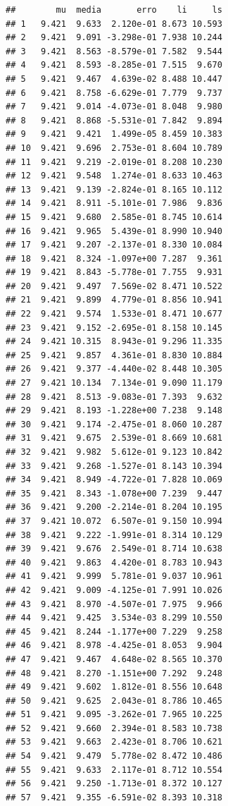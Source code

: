\documentclass[
]{book}
\begin{document}
\begin{verbatim}
##        mu  media       erro    li     ls
## 1   9.421  9.633  2.120e-01 8.673 10.593
## 2   9.421  9.091 -3.298e-01 7.938 10.244
## 3   9.421  8.563 -8.579e-01 7.582  9.544
## 4   9.421  8.593 -8.285e-01 7.515  9.670
## 5   9.421  9.467  4.639e-02 8.488 10.447
## 6   9.421  8.758 -6.629e-01 7.779  9.737
## 7   9.421  9.014 -4.073e-01 8.048  9.980
## 8   9.421  8.868 -5.531e-01 7.842  9.894
## 9   9.421  9.421  1.499e-05 8.459 10.383
## 10  9.421  9.696  2.753e-01 8.604 10.789
## 11  9.421  9.219 -2.019e-01 8.208 10.230
## 12  9.421  9.548  1.274e-01 8.633 10.463
## 13  9.421  9.139 -2.824e-01 8.165 10.112
## 14  9.421  8.911 -5.101e-01 7.986  9.836
## 15  9.421  9.680  2.585e-01 8.745 10.614
## 16  9.421  9.965  5.439e-01 8.990 10.940
## 17  9.421  9.207 -2.137e-01 8.330 10.084
## 18  9.421  8.324 -1.097e+00 7.287  9.361
## 19  9.421  8.843 -5.778e-01 7.755  9.931
## 20  9.421  9.497  7.569e-02 8.471 10.522
## 21  9.421  9.899  4.779e-01 8.856 10.941
## 22  9.421  9.574  1.533e-01 8.471 10.677
## 23  9.421  9.152 -2.695e-01 8.158 10.145
## 24  9.421 10.315  8.943e-01 9.296 11.335
## 25  9.421  9.857  4.361e-01 8.830 10.884
## 26  9.421  9.377 -4.440e-02 8.448 10.305
## 27  9.421 10.134  7.134e-01 9.090 11.179
## 28  9.421  8.513 -9.083e-01 7.393  9.632
## 29  9.421  8.193 -1.228e+00 7.238  9.148
## 30  9.421  9.174 -2.475e-01 8.060 10.287
## 31  9.421  9.675  2.539e-01 8.669 10.681
## 32  9.421  9.982  5.612e-01 9.123 10.842
## 33  9.421  9.268 -1.527e-01 8.143 10.394
## 34  9.421  8.949 -4.722e-01 7.828 10.069
## 35  9.421  8.343 -1.078e+00 7.239  9.447
## 36  9.421  9.200 -2.214e-01 8.204 10.195
## 37  9.421 10.072  6.507e-01 9.150 10.994
## 38  9.421  9.222 -1.991e-01 8.314 10.129
## 39  9.421  9.676  2.549e-01 8.714 10.638
## 40  9.421  9.863  4.420e-01 8.783 10.943
## 41  9.421  9.999  5.781e-01 9.037 10.961
## 42  9.421  9.009 -4.125e-01 7.991 10.026
## 43  9.421  8.970 -4.507e-01 7.975  9.966
## 44  9.421  9.425  3.534e-03 8.299 10.550
## 45  9.421  8.244 -1.177e+00 7.229  9.258
## 46  9.421  8.978 -4.425e-01 8.053  9.904
## 47  9.421  9.467  4.648e-02 8.565 10.370
## 48  9.421  8.270 -1.151e+00 7.292  9.248
## 49  9.421  9.602  1.812e-01 8.556 10.648
## 50  9.421  9.625  2.043e-01 8.786 10.465
## 51  9.421  9.095 -3.262e-01 7.965 10.225
## 52  9.421  9.660  2.394e-01 8.583 10.738
## 53  9.421  9.663  2.423e-01 8.706 10.621
## 54  9.421  9.479  5.778e-02 8.472 10.486
## 55  9.421  9.633  2.117e-01 8.712 10.554
## 56  9.421  9.250 -1.713e-01 8.372 10.127
## 57  9.421  9.355 -6.591e-02 8.393 10.318

\end{verbatim}
\end{document}
